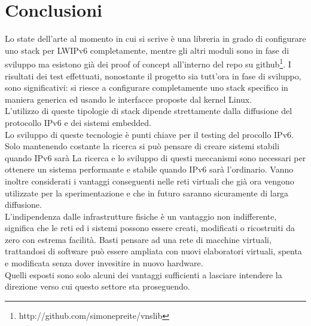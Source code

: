 
\chapter*{Conclusioni}
Lo state dell'arte al momento in cui si scrive \`e una libreria in grado di configurare uno stack per LWIPv6 completamente, mentre gli altri moduli sono in fase di sviluppo ma esistono gi\`a dei proof of concept all'interno del repo su github\footnote{http://github.com/simonepreite/vnslib}.
I risultati dei test effettuati, nonostante il progetto sia tutt'ora in fase di sviluppo, sono significativi: si riesce a configurare completamente uno stack specifico in maniera generica ed usando le interfacce proposte dal kernel Linux.\\
L'utilizzo di queste tipologie di stack dipende strettamente dalla diffusione del protocollo IPv6 e dei sistemi embedded.\\
Lo sviluppo di queste tecnologie \`e punti chiave per il testing del procollo IPv6. Solo mantenendo costante la ricerca si pu\`o pensare di creare sistemi stabili quando IPv6 sar\`a
La ricerca e lo sviluppo di questi meccanismi sono necessari per ottenere un sistema performante e stabile quando IPv6 sar\`a l'ordinario. Vanno inoltre considerati i vantaggi conseguenti nelle reti virtuali che gi\`a ora vengono utilizzate per la sperimentazione e che in futuro saranno sicuramente di larga diffusione.\\
L'indipendenza dalle infrastrutture fisiche \`e un vantaggio non indifferente, significa che le reti ed i sistemi possono essere creati, modificati o ricostruiti da zero con estrema facilit\`a. Basti pensare ad una rete di macchine virtuali, trattandosi di software pu\`o essere ampliata con nuovi elaboratori virtuali, spenta e modificata senza dover invesitire in nuovo hardware.\\
Quelli esposti sono solo alcuni dei vantaggi sufficienti a lasciare intendere la direzione verso cui questo settore sta proseguendo.
